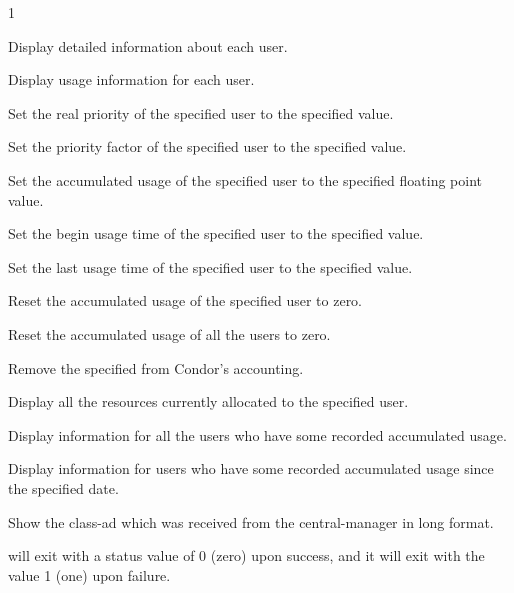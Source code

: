 \begin{ManPage}{\label{man-condor-userprio}}{1}
\begin{Options}
	{Display detailed information about each user.}

	{Display usage information for each user.}

	{Set the real priority of the specified user to the specified value.}

	{Set the priority factor of the specified user to the specified value.}

	{Set the accumulated usage of the specified user to the specified floating
     point value.}

	{Set the begin usage time of the specified user to the specified value.}

	{Set the last usage time of the specified user to the specified value.}

	{Reset the accumulated usage of the specified user to zero.}

	{Reset the accumulated usage of all the users to zero.}

	{Remove the specified  from Condor's accounting.}

	{Display all the resources currently allocated to the specified user.}

	{Display information for all the users who have some recorded accumulated usage.}

	{Display information for users who have some recorded accumulated usage since
the specified date.}

	{Show the class-ad which was received from the central-manager in long format.}

\end{Options}

\ExitStatus

 will exit with a status value of 0 (zero) upon success,
and it will exit with the value 1 (one) upon failure.

\end{ManPage}
